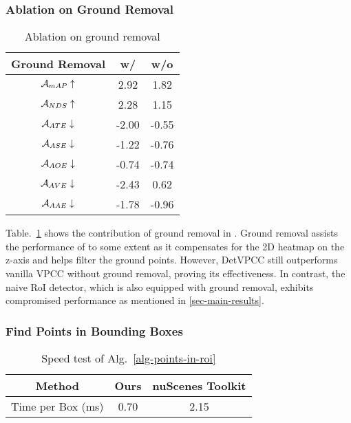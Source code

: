 \vspace{-0.2cm}
\subsubsection{Ablation on Ground Removal}

\begin{table}[ht]
\vspace{-0.4cm}
\centering
\renewcommand{\arraystretch}{\TABVSPACE} %
\setlength{\tabcolsep}{12pt} %
\caption{Ablation on ground removal}
\begin{tabular}{c|c|c}
\hline
Ground Removal & w/ & w/o \\
\hline
        $\mathcal{A}_{mAP}\uparrow$ & 2.92 & 1.82 \\ 
        $\mathcal{A}_{NDS}\uparrow$ & 2.28 & 1.15 \\ 
        $\mathcal{A}_{ATE}\downarrow$ & -2.00 & -0.55 \\ 
        $\mathcal{A}_{ASE}\downarrow$ & -1.22 & -0.76 \\ 
        $\mathcal{A}_{AOE}\downarrow$ & -0.74 & -0.74 \\ 
        $\mathcal{A}_{AVE}\downarrow$ & -2.43 & 0.62 \\ 
        $\mathcal{A}_{AAE}\downarrow$ & -1.78 & -0.96 \\ 
\hline
\end{tabular}
\label{tab-abla-ground-removal}
\vspace{-0.2cm}
\end{table}


Table.~\ref{tab-abla-ground-removal} shows the contribution of ground removal in \methodname{}. Ground removal assists the performance of \methodname{} to some extent as it compensates for the 2D heatmap on the z-axis and helps filter the ground points. However, DetVPCC still outperforms vanilla VPCC without ground removal, proving its effectiveness. In contrast, the naive RoI detector, which is also equipped with ground removal, exhibits compromised performance as mentioned in \cref{sec-main-results}.


\subsubsection{Find Points in Bounding Boxes}
\vspace{-0.4cm}
\begin{table}[ht]
    \centering
    \caption{Speed test of Alg.~\ref{alg-points-in-roi}}
    \begin{tabular}{c|c|c}
    \hline
        Method & Ours & nuScenes Toolkit \\ \hline
        Time per Box (ms) & 0.70 & 2.15 \\ \hline
    \end{tabular}
    \label{tab-alg1-speed}
\vspace{-0.2cm}
\end{table}

